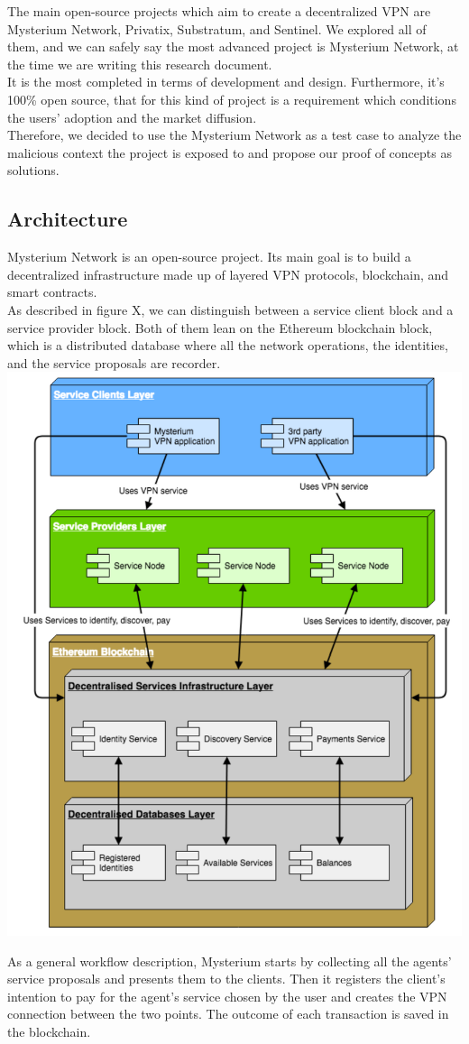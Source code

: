 \documentclass[]{article}
\begin{document}
	The main open-source projects which aim to create a decentralized VPN are Mysterium Network, Privatix, Substratum, and Sentinel. We explored all of them, and we can safely say the most advanced project is Mysterium Network, at the time we are writing this research document.\\It is the most completed in terms of development and design. Furthermore, it's 100\% open source, that for this kind of project is a requirement which conditions the users' adoption and the market diffusion.\\
	Therefore, we decided to use the Mysterium Network as a test case to analyze the malicious context the project is exposed to and propose our proof of concepts as solutions.
	
	\subsection{Architecture}
	Mysterium Network is an open-source project. Its main goal is to build a decentralized infrastructure made up of layered VPN protocols, blockchain, and smart contracts.\\
	As described in figure X, we can distinguish between a service client block and a service provider block. Both of them lean on the Ethereum blockchain block, which is a distributed database where all the network operations, the identities, and the service proposals are recorder.\\

	\includegraphics[width=0.5\linewidth]{"images/mysterium_architecture.png"}
		
	As a general workflow description, Mysterium starts by collecting all the agents' service proposals and presents them to the clients. Then it registers the client's intention to pay for the agent's service chosen by the user and creates the VPN connection between the two points. The outcome of each transaction is saved in the blockchain.\\
	
\end{document}
